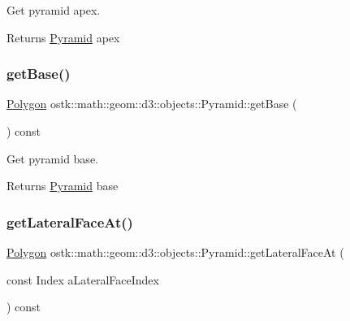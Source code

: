 Get pyramid apex. 

\begin{DoxyReturn}{Returns}
\hyperlink{classostk_1_1math_1_1geom_1_1d3_1_1objects_1_1_pyramid}{Pyramid} apex 
\end{DoxyReturn}
\mbox{\label{classostk_1_1math_1_1geom_1_1d3_1_1objects_1_1_pyramid_ae1f35fb024a1cd171b750170cb1df0a4}} 
\subsubsection{\texorpdfstring{get\+Base()}{getBase()}}
{\footnotesize\ttfamily \hyperlink{classostk_1_1math_1_1geom_1_1d3_1_1objects_1_1_polygon}{Polygon} ostk\+::math\+::geom\+::d3\+::objects\+::\+Pyramid\+::get\+Base (\begin{DoxyParamCaption}{ }\end{DoxyParamCaption}) const}



Get pyramid base. 

\begin{DoxyReturn}{Returns}
\hyperlink{classostk_1_1math_1_1geom_1_1d3_1_1objects_1_1_pyramid}{Pyramid} base 
\end{DoxyReturn}
\mbox{\label{classostk_1_1math_1_1geom_1_1d3_1_1objects_1_1_pyramid_a5c29f2b5915fbcf7a200b49840805c86}} 
\subsubsection{\texorpdfstring{get\+Lateral\+Face\+At()}{getLateralFaceAt()}}
{\footnotesize\ttfamily \hyperlink{classostk_1_1math_1_1geom_1_1d3_1_1objects_1_1_polygon}{Polygon} ostk\+::math\+::geom\+::d3\+::objects\+::\+Pyramid\+::get\+Lateral\+Face\+At (\begin{DoxyParamCaption}\item[{const Index}]{a\+Lateral\+Face\+Index }\end{DoxyParamCaption}) const}



